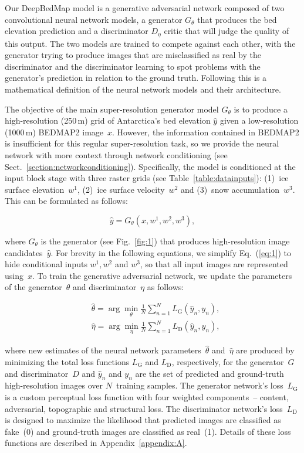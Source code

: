 Our DeepBedMap model is a generative adversarial network \citep{GoodfellowGenerativeAdversarialNetworks2014} composed of two convolutional neural network models, a generator $G_\theta$ that produces the bed elevation prediction and a discriminator $D_\eta$ critic that will judge the quality of this output.
The two models are trained to compete against each other, with the generator trying to produce images that are misclassified as real by the discriminator and the discriminator learning to spot problems with the generator's prediction in relation to the ground truth.
Following this is a mathematical definition of the neural network models and their architecture.

The objective of the main super-resolution generator model $G_\theta$ is to produce a high-resolution (250\,\unit{m}) grid of Antarctica's bed elevation $\hat{y}$ given a low-resolution (1000\,\unit{m}) BEDMAP2 \citep{FretwellBedmap2improvedice2013} image~$x$.
However, the information contained in BEDMAP2 is insufficient for this regular super-resolution task, so we provide the neural network with more context through network conditioning (see Sect.~\ref{section:networkconditioning}).
Specifically, the model is conditioned at the input block stage with three raster grids (see Table~\ref{table:datainputs}): (1)~ice surface elevation~$w^1$, (2)~ice surface velocity~$w^2$ and (3)~snow accumulation~$w^3$.
This can be formulated as follows:

\begin{equation}\label{eq:1}
  \hat{y} = G_\theta(x, w^1, w^2, w^3),
\end{equation}

where $G_\theta$ is the generator (see Fig.~\ref{fig:1}) that produces high-resolution image candidates~$\hat{y}$.
For brevity in the following equations, we simplify Eq.~(\ref{eq:1}) to hide conditional inputs $w^1, w^2$ and  $w^3$, so that all input images are represented using~$x$.
To train the generative adversarial network, we update the parameters of the generator~$\theta$ and discriminator~$\eta$ as follows:

\begin{align}
  &\hat{\theta} = \arg\min_{\theta} \frac{1}{N}\sum_{n=1}^{N}L_{\mathrm{G}}(\hat{y}_n, y_n), \label{eq:2}\\
  &\hat{\eta} = \arg\min_{\eta} \frac{1}{N}\sum_{n=1}^{N}L_{\mathrm{D}}(\hat{y}_n, y_n), \label{eq:3}
\end{align}

where new estimates of the neural network parameters~$\hat{\theta}$ and~$\hat{\eta}$ are produced by minimizing the total loss functions $L_{\mathrm{G}}$ and $L_{\mathrm{D}}$, respectively, for the generator~$G$ and discriminator~$D$ and $\hat{y}_n$ and $y_n$ are the set of predicted and ground-truth high-resolution images over $N$~training samples.
The generator network's loss~$L_{\mathrm{G}}$ is a custom perceptual loss function with four weighted components~-- content, adversarial, topographic and structural loss.
The discriminator network's loss~$L_{\mathrm{D}}$ is designed to maximize the likelihood that predicted images are classified as fake~(0) and ground-truth images are classified as real~(1).
Details of these loss functions are described in Appendix~\ref{appendix:A}.

